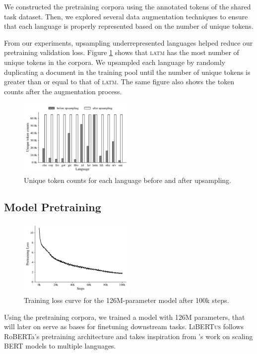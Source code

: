 \documentclass[11pt]{article}
\newcommand{\libertus}{\textsc{LiBERTus}}
\begin{document}
We constructed the pretraining corpora using the annotated tokens of the shared task dataset.
Then, we explored several data augmentation techniques to ensure that each language is properly represented based on the number of unique tokens.

From our experiments, upsampling underrepresented languages helped reduce our pretraining validation loss.
Figure \ref{fig:unique_tokens} shows that \textsc{latm} has the most number of unique tokens in the corpora.
We upsampled each language by randomly duplicating a document in the training pool until the number of unique tokens is greater than or equal to that of \textsc{latm}.
The same figure also shows the token counts after the augmentation process.

\begin{figure}[t]
\centering
\includegraphics[width=0.5\textwidth]{figures/token_counts.pdf}
\caption{Unique token counts for each language before and after upsampling.}
\label{fig:unique_tokens}
\end{figure}

\subsection{Model Pretraining}

\begin{figure}[t]
\centering
\includegraphics[width=0.5\textwidth]{figures/train_loss.pdf}
\caption{Training loss curve for the 126M-parameter model after 100k steps.}
\label{fig:training_curve}
\end{figure}

Using the pretraining corpora, we trained a model with 126M parameters, that will later on serve as bases for finetuning downstream tasks.
\libertus{} follows RoBERTa's pretraining architecture \cite{liu-etal-2019-roberta} and takes inspiration from \citet{conneau-etal-2020-unsupervised}'s work on scaling BERT models to multiple languages.
\end{document}

